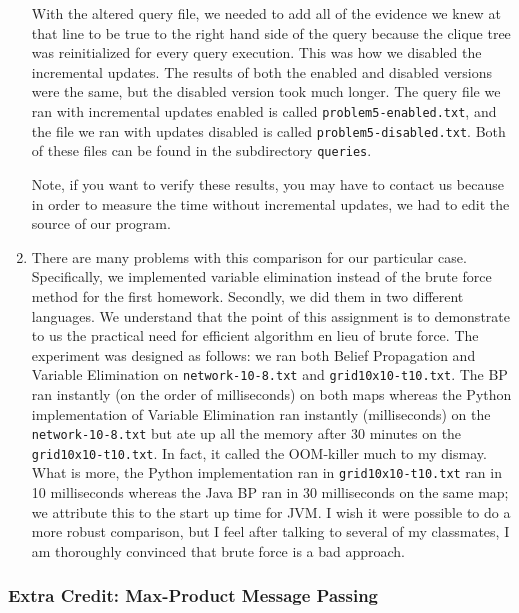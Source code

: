 \documentclass[11pt,a4paper]{article}
\begin{document}
\begin{enumerate}
		With the altered query file, we needed to add all of the evidence we knew at that
		line to be true to the right hand side of the query because the clique tree was
		reinitialized for every query execution. This was how we disabled the incremental
		updates. The results of both the enabled and disabled versions were the same, but
		the disabled version took much longer. The query file we ran with incremental
		updates enabled is called {\tt problem5-enabled.txt}, and the file we ran with
		updates disabled is called {\tt problem5-disabled.txt}. Both of these files can be
		found in the subdirectory {\tt queries}. 
		
		Note, if you want to verify these results, you may have to contact us because
		in order to measure the time without incremental updates, we had to edit the
		source of our program.
		
		\item 
		There are many problems with this comparison for our particular case. Specifically, 
		we implemented variable elimination instead of the brute force method for the first homework.
		 Secondly, we did them in two different languages. We understand that the point of this 
		 assignment is to demonstrate to us the practical need for efficient algorithm en lieu 
		 of brute force. The experiment was designed as follows: we ran both Belief Propagation
		 and Variable Elimination on \texttt{network-10-8.txt} and \texttt{grid10x10-t10.txt}. 
		 The BP ran instantly (on the order of milliseconds) on both maps whereas the Python
		 implementation of Variable Elimination ran instantly (milliseconds) on the
		 \texttt{network-10-8.txt} but ate up all the memory after 30 minutes on the 
		 \texttt{grid10x10-t10.txt}. In fact, it called the OOM-killer much to my dismay. 
		 What is more, the Python implementation ran in \texttt{grid10x10-t10.txt} ran in 
		 10 milliseconds whereas the Java BP ran in 30 milliseconds on the same map; we 
		 attribute this to the start up time for JVM. I wish it were possible to do a more robust 
		 comparison, but I feel after talking to several of my classmates, I am thoroughly convinced 
		 that brute force is a bad approach. 
	\end{enumerate}
	
	\subsubsection{Extra Credit: Max-Product Message Passing}
	
\end{document}
